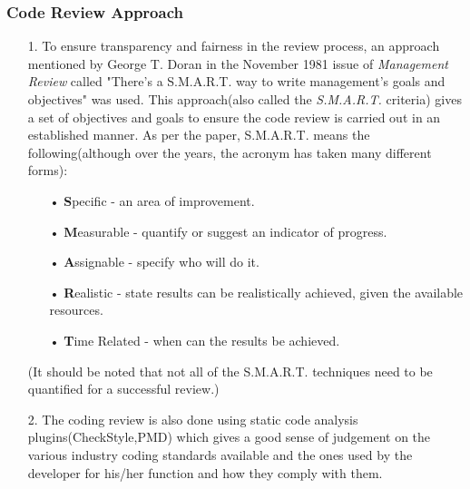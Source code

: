 \documentclass[12pt]{report}
\begin{document}
	\subsubsection{Code Review Approach}
	\begin{enumerate}
		\item[1.] To ensure transparency  and fairness in the review process, an approach mentioned by George T. Doran in the November 1981 issue of \textit{Management Review} called "There's a S.M.A.R.T. way to write management's goals and objectives" was used. This approach(also called the \textit{S.M.A.R.T.} criteria) gives a set of objectives and goals to ensure the code review is carried out in an established manner. As per the paper, S.M.A.R.T. means the following(although over the years, the acronym has taken many different forms):
	\begin{itemize}
	\item[•]\textbf{S}pecific - an area of improvement.
	\item[•]\textbf{M}easurable - quantify or suggest an indicator of progress.
	\item[•]\textbf{A}ssignable - specify who will do it.
	\item[•]\textbf{R}ealistic - state results can be realistically achieved, given the available resources.  
	\item[•]\textbf{T}ime Related - when can the results be achieved.
	\end{itemize}
	(It should be noted that not all of the S.M.A.R.T. techniques need to be quantified for a successful review.)
		\item[2.] The coding review is also done using static code analysis plugins(CheckStyle,PMD) which gives a good sense of judgement on the various industry coding standards available and the ones used by the developer for his/her function and how they comply with them.
    \end{enumerate}		
\end{document}
